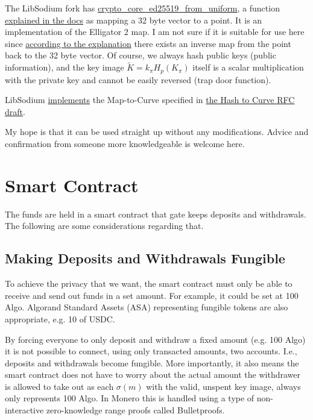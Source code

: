 \documentclass[9pt]{article}
\begin{document}
The LibSodium fork has \href{https://github.com/algorand/go-algorand/blob/master/crypto/libsodium-fork/src/libsodium/crypto_core/ed25519/core_ed25519.c#L66}{crypto\_core\_ed25519\_from\_uniform}, a function \href{https://libsodium.gitbook.io/doc/advanced/point-arithmetic#elligator-2-map}{explained in the docs} as mapping a 32 byte vector to a point. It is an implementation of the Elligator 2 map. I am not sure if it is suitable for use here since \href{https://elligator.org/map}{according to the explanation} there exists an inverse map from the point back to the 32 byte vector. Of course, we always hash public keys (public information), and the key image $\tilde{K} = k_\pi H_p(K_\pi)$ itself is a scalar multiplication with the private key and cannot be easily reversed (trap door function).

 LibSodium \href{https://elligator.org/implementations}{implements} the Map-to-Curve specified in \href{https://datatracker.ietf.org/doc/html/draft-irtf-cfrg-hash-to-curve-16}{the Hash to Curve RFC draft}.

My hope is that it can be used straight up without any modifications. Advice and confirmation from someone more knowledgeable is welcome here.

\section{Smart Contract}

The funds are held in a smart contract that gate keeps deposits and withdrawals. The following are some considerations regarding that.

\subsection{Making Deposits and Withdrawals Fungible}

To achieve the privacy that we want, the smart contract must only be able to receive and send out funds in a set amount. For example, it could be set at 100 Algo. Algorand Standard Assets (ASA) representing fungible tokens are also appropriate, e.g. 10 of USDC.

By forcing everyone to only deposit and withdraw a fixed amount (e.g. 100 Algo) it is not possible to connect, using only transacted amounts, two accounts. I.e., deposits and withdrawals become fungible. More importantly, it also means the smart contract does not have to worry about the actual amount the withdrawer is allowed to take out as each $\sigma(m)$ with the valid, unspent key image, always only represents 100 Algo. In Monero this is handled using a type of non-interactive zero-knowledge range proofs called Bulletproofs.
\end{document}
